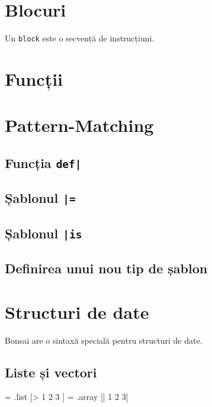 \documentclass[12pt,a4paper]{memoir}
\begin{document}
\begin{itemize}
\section{Blocuri}

Un \texttt{block} este o secvență de instrucțiuni.


\section{Funcții}


\section{Pattern-Matching}

\subsection{Funcția \texttt{def|}}

\subsection{Șablonul \texttt{|=}}

\subsection{Șablonul \texttt{|is}}


\subsection{Definirea unui nou tip de șablon}

\section{Structuri de date}

Bonsai are o sintaxă specială pentru structuri de date.

\subsection{Liste și vectori}

\begin{code}
= .list [> 1 2 3 ]
= .array [| 1 2 3]
\end{code}


\end{itemize}
\end{document}
